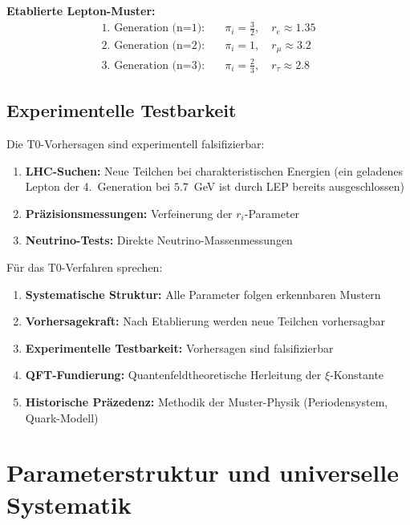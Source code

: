 	\textbf{Etablierte Lepton-Muster:}
	\begin{align}
		\text{1. Generation (n=1):} \quad &\pi_i = \frac{3}{2}, \quad r_e \approx 1.35 \\
		\text{2. Generation (n=2):} \quad &\pi_i = 1, \quad r_\mu \approx 3.2 \\
		\text{3. Generation (n=3):} \quad &\pi_i = \frac{2}{3}, \quad r_\tau \approx 2.8
	\end{align}
	
	\subsection{Experimentelle Testbarkeit}
	\label{subsec:experimentelle_testbarkeit}
	
	Die T0-Vorhersagen sind experimentell falsifizierbar:
	
	\begin{enumerate}
		\item \textbf{LHC-Suchen:} Neue Teilchen bei charakteristischen Energien (ein geladenes Lepton der 4.~Generation bei $5.7$~GeV ist durch LEP bereits ausgeschlossen)
		\item \textbf{Präzisionsmessungen:} Verfeinerung der $r_i$-Parameter
		\item \textbf{Neutrino-Tests:} Direkte Neutrino-Massenmessungen
	\end{enumerate}
	
	Für das T0-Verfahren sprechen:
	
	\begin{enumerate}
		\item \textbf{Systematische Struktur:} Alle Parameter folgen erkennbaren Mustern
		\item \textbf{Vorhersagekraft:} Nach Etablierung werden neue Teilchen vorhersagbar
		\item \textbf{Experimentelle Testbarkeit:} Vorhersagen sind falsifizierbar
		\item \textbf{QFT-Fundierung:} Quantenfeldtheoretische Herleitung der $\xi$-Konstante
		\item \textbf{Historische Präzedenz:} Methodik der Muster-Physik (Periodensystem, Quark-Modell)
	\end{enumerate}
	
	\section{Parameterstruktur und universelle Systematik}
	\label{sec:parameterfreie_natur}
	
